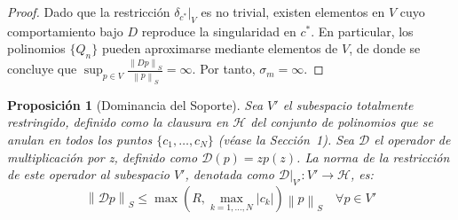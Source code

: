\documentclass[12pt,a4paper]{article}
\newtheorem{proposicion}{Proposición}
\theoremstyle{definition}
\theoremstyle{remark}
\newcommand{\norm}[1]{\left\| #1 \right\|_S}
\newcommand{\D}{\mathcal{D}}
\begin{document}
\begin{proof}
    Dado que la restricción $\delta_{c^*}|_V$ es no trivial, existen elementos en $V$ cuyo comportamiento bajo $D$ reproduce la singularidad en $c^*$. En particular, los polinomios $\{Q_n\}$ pueden aproximarse mediante elementos de $V$, de donde se concluye que $\sup_{p \in V} \frac{\norm{Dp}}{\norm{p}} = \infty$. Por tanto, $\sigma_m = \infty$.
\end{proof}

\begin{proposicion}[Dominancia del Soporte]
    Sea $V'$ el subespacio totalmente restringido, definido como la clausura en $\mathcal{H}$ del conjunto de polinomios que se anulan en todos los puntos $\{c_1, \dots, c_N\}$ (véase la Sección~1).
    Sea $\D$ el operador de multiplicación por z, definido como $\D(p) = z p(z)$. La norma de la restricción de este operador al subespacio $V'$, denotada como $\D|_{V'} : V' \to \mathcal{H}$, es:
    \begin{equation}
        \norm{\D p} \le \max \left( R, \max_{k=1,\dots,N} |c_k| \right) \norm{p} \quad \forall p \in V'
    \end{equation}
\end{proposicion}
\end{document}
